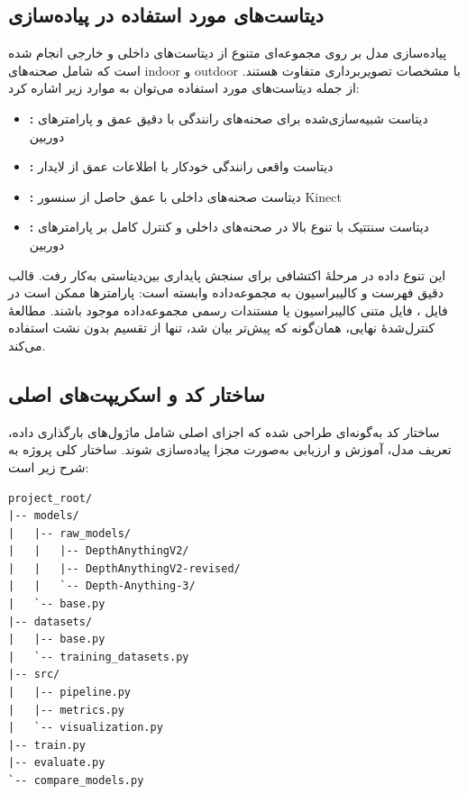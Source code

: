 \subsection{دیتاست‌های مورد استفاده در پیاده‌سازی}

پیاده‌سازی مدل بر روی مجموعه‌ای متنوع از دیتاست‌های داخلی و خارجی انجام شده است که شامل صحنه‌های indoor و outdoor با مشخصات تصویربرداری متفاوت هستند. از جمله دیتاست‌های مورد استفاده می‌توان به موارد زیر اشاره کرد:

\begin{itemize}
    \item \textbf{:} دیتاست شبیه‌سازی‌شده برای صحنه‌های رانندگی با  دقیق عمق و پارامترهای دوربین
    \item \textbf{:} دیتاست واقعی رانندگی خودکار با اطلاعات عمق از لایدار
    \item \textbf{:} دیتاست صحنه‌های داخلی با عمق حاصل از سنسور Kinect
    \item \textbf{:} دیتاست سنتتیک با تنوع بالا در صحنه‌های داخلی و کنترل کامل بر پارامترهای دوربین
\end{itemize}

این تنوع داده در مرحلهٔ اکتشافی برای سنجش پایداری بین‌دیتاستی به‌کار رفت. قالب دقیق فهرست و کالیبراسیون به مجموعه‌داده وابسته است: پارامترها ممکن است در فایل ، فایل متنی کالیبراسیون یا مستندات رسمی مجموعه‌داده موجود باشند. مطالعهٔ کنترل‌شدهٔ نهایی، همان‌گونه که پیش‌تر بیان شد، تنها از تقسیم بدون نشت  استفاده می‌کند.
\subsection{ساختار کد و اسکریپت‌های اصلی}

ساختار کد به‌گونه‌ای طراحی شده که اجزای اصلی شامل ماژول‌های بارگذاری داده، تعریف مدل، آموزش و ارزیابی به‌صورت مجزا پیاده‌سازی شوند. ساختار کلی پروژه به شرح زیر است:

\begin{latin}
\small
\begin{verbatim}
project_root/
|-- models/
|   |-- raw_models/
|   |   |-- DepthAnythingV2/
|   |   |-- DepthAnythingV2-revised/
|   |   `-- Depth-Anything-3/
|   `-- base.py
|-- datasets/
|   |-- base.py
|   `-- training_datasets.py
|-- src/
|   |-- pipeline.py
|   |-- metrics.py
|   `-- visualization.py
|-- train.py
|-- evaluate.py
`-- compare_models.py
\end{verbatim}
\end{latin}


